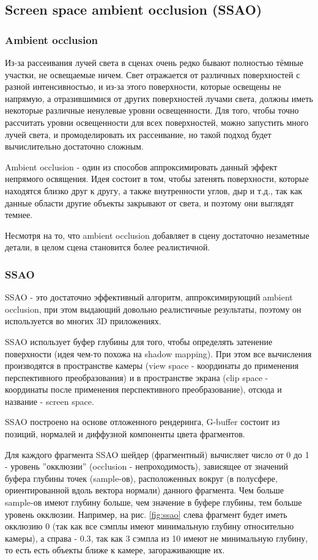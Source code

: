 \documentclass[14pt]{extarticle}
\begin{document}
\subsection{Screen space ambient occlusion (SSAO)}
\subsubsection{Ambient occlusion}
Из-за рассеивания лучей света в сценах очень редко бывают полностью тёмные участки, не освещаемые ничем. Свет отражается от различных поверхностей с разной интенсивностью, и из-за этого поверхности, которые освещены не напрямую, а отразившимися от других поверхностей лучами света, должны иметь некоторые различные ненулевые уровни освещенности. Для того, чтобы точно рассчитать уровни освещенности для всех поверхностей, можно запустить много лучей света, и промоделировать их рассеивание, но такой подход будет вычислительно достаточно сложным. 

Ambient occlusion - один из способов аппроксимировать данный эффект непрямого освящения. Идея состоит в том, чтобы затенять поверхности, которые находятся близко друг к другу, а также внутренности углов, дыр и т.д., так как данные области другие объекты закрывают от света, и поэтому они выглядят темнее.

Несмотря на то, что ambient occlusion добавляет в сцену достаточно незаметные детали, в целом сцена становится более реалистичной.

\subsubsection{SSAO}
SSAO - это достаточно эффективный алгоритм, аппроксимирующий ambient occlusion, при этом выдающий довольно реалистичные результаты, поэтому он используется во многих 3D приложениях.

SSAO использует буфер глубины для того, чтобы определять затенение поверхности (идея чем-то похожа на shadow mapping). При этом все вычисления производятся в пространстве камеры (view space - координаты до применения перспективного преобразования) и в пространстве экрана (clip space - координаты после применения перспективного преобразование), отсюда и название - screen space.

SSAO построено на основе отложенного рендеринга, G-buffer состоит из позиций, нормалей и диффузной компоненты цвета фрагментов.

Для каждого фрагмента SSAO шейдер (фрагментный) вычисляет число от 0 до 1 - уровень ''окклюзии'' (occlusion - непроходимость), зависящее от значений буфера глубины точек (sample-ов), расположенных вокруг (в полусфере, ориентированной вдоль вектора нормали) данного фрагмента. Чем больше sample-ов имеют глубину больше, чем значение в буфере глубины, тем больше уровень окклюзии. Например, на рис. \ref{fig:ssao} слева фрагмент будет иметь окклюзию $0$ (так как все сэмплы имеют минимальную глубину относительно камеры), а справа - $0.3$, так как 3 сэмпла из 10 имеют не минимальную глубину, то есть есть объекты ближе к камере, загораживающие их.
\end{document}
